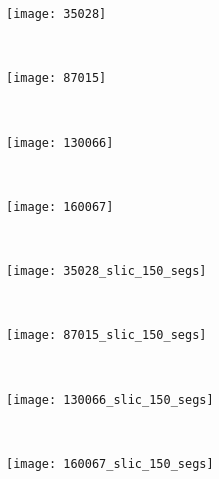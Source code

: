 \begin{figure}[!ht]
    \centering
    \begin{subfigure}[t]{\textwidth+20pt\relax}
    	\texttt{[image: 35028]} 
    \end{subfigure}      
    ~ %
    \begin{subfigure}[b]{0.2\textwidth}
        \texttt{[image: 87015]}
    \end{subfigure}
    ~ %
    \begin{subfigure}[b]{0.2\textwidth}
        \texttt{[image: 130066]}
    \end{subfigure}
    ~ %
    \begin{subfigure}[b]{0.2\textwidth}
        \texttt{[image: 160067]}
    \end{subfigure} \\[2ex]       
    
    \begin{subfigure}[t]{\textwidth+20pt\relax}
    	\texttt{[image: 35028\_slic\_150\_segs]} 
    \end{subfigure}      
    ~ %
    \begin{subfigure}[b]{0.2\textwidth}
        \texttt{[image: 87015\_slic\_150\_segs]}
    \end{subfigure}
    ~ %
    \begin{subfigure}[b]{0.2\textwidth}
        \texttt{[image: 130066\_slic\_150\_segs]}
    \end{subfigure}
    ~ %
    \begin{subfigure}[b]{0.2\textwidth}
        \texttt{[image: 160067\_slic\_150\_segs]}
    \end{subfigure} \\ [2ex]
    

\end{figure}
